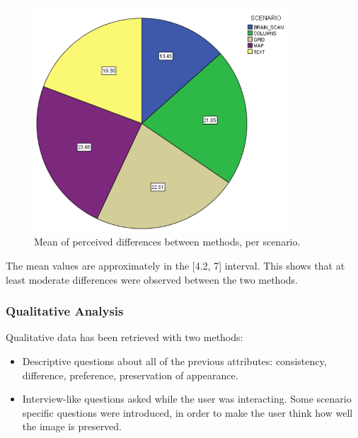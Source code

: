 \documentclass[]{article}
\begin{document}
\begin{figure}[!h]
    \centering
    \includegraphics[width=0.85\textwidth]{figures/results/DifferenceChart.PNG}
    \caption{Mean of perceived differences between methods, per scenario.}
    \label{fig:DifferenceChart}
\end{figure}

The mean values are approximately in the [4.2, 7] interval. This shows that at least moderate differences were observed between the two methods.

\subsubsection{Qualitative Analysis}
\label{sec:QualitativeAnalysis}
Qualitative data has been retrieved with two methods: 
\begin{itemize}[noitemsep,topsep=0pt]
\item Descriptive questions about all of the previous attributes: consistency, difference, preference, preservation of appearance.
\item Interview-like questions asked while the user was interacting. Some scenario specific questions were introduced, in order to make the user think how well the image is preserved.
\end{itemize} 
\end{document}
